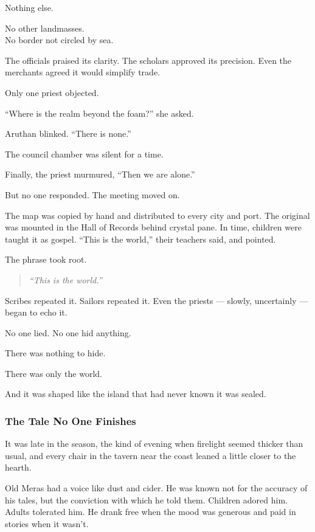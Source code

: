 \documentclass[12pt]{article}
\begin{document}
Nothing else.

No other landmasses.\\
No border not circled by sea.

The officials praised its clarity. The scholars approved its precision. Even the merchants agreed it would simplify trade.

Only one priest objected.

``Where is the realm beyond the foam?'' she asked.

Aruthan blinked. ``There is none.''

The council chamber was silent for a time.

Finally, the priest murmured, ``Then we are alone.''

But no one responded. The meeting moved on.

The map was copied by hand and distributed to every city and port. The original was mounted in the Hall of Records behind crystal pane. In time, children were taught it as gospel. ``This is the world,'' their teachers said, and pointed.

The phrase took root.

\begin{quote}
\emph{``This is the world.''}
\end{quote}

Scribes repeated it. Sailors repeated it. Even the priests — slowly, uncertainly — began to echo it.

No one lied. No one hid anything.

There was nothing to hide.

There was only the world.

And it was shaped like the island that had never known it was sealed.


\dotfill

\subsubsection*{The Tale No One Finishes}

It was late in the season, the kind of evening when firelight seemed thicker than usual, and every chair in the tavern near the coast leaned a little closer to the hearth.

Old Meras had a voice like dust and cider. He was known not for the accuracy of his tales, but the conviction with which he told them. Children adored him. Adults tolerated him. He drank free when the mood was generous and paid in stories when it wasn’t.
\end{document}
